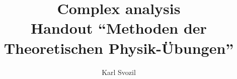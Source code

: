 
\documentclass[prl,preprint,showpacs,showkeys,amsfonts]{revtex4}
\usepackage{graphicx}
 \RequirePackage{times}
\RequirePackage{mathptm}






\title{Complex analysis\\
Handout ``Methoden der Theoretischen Physik-\"Ubungen''}
\author{Karl Svozil}

\begin{abstract}
Some results of complex analysis are reviewed.
\end{abstract}



\maketitle


 Falls nicht anders erw\"ahnt,  wird vorausgesetzt, da\ss $\,$ die
Riemann'sche Fl\"ache der
 Funktion $f$ einfach zusammenh\"angend ist.

 \subsection{Definition Differenzierbarkeit, Analytizit\"at}
 Gegeben Funktion $f(z)$ auf Gebiet $G(f)$. $f$
 hei\ss t in $z_0$ {\em differenziebar}, falls der Differentialquotient
 $${df\over dz}\vert_{z_0}=f'(z)\vert_{z_0} ={\partial f\over \partial
 x}\vert_{z_0} ={1\over i}{\partial f\over \partial y}\vert_{z_0}$$
 existiert.

 Falls $f$ auf dem gesamten Gebiet $G$ differenzierbar ist, hei\ss t
 die Funktion {\em analytisch / regul\"ar / holomorph}.




 \subsection{Cauchy--Riemann'sche Differentialgleichungen}
 Die Funktion $f(z)=u(z)+iv(z)$ (wobei $u$ \& $v$ reelwertig sind) ist
 {\em analytisch / regul\"ar / holomorph} dann und nur dann, wenn
 ($a_b=\partial a/\partial b$)
 $$u_x=v_y, \qquad u_y=-v_x\quad .$$



